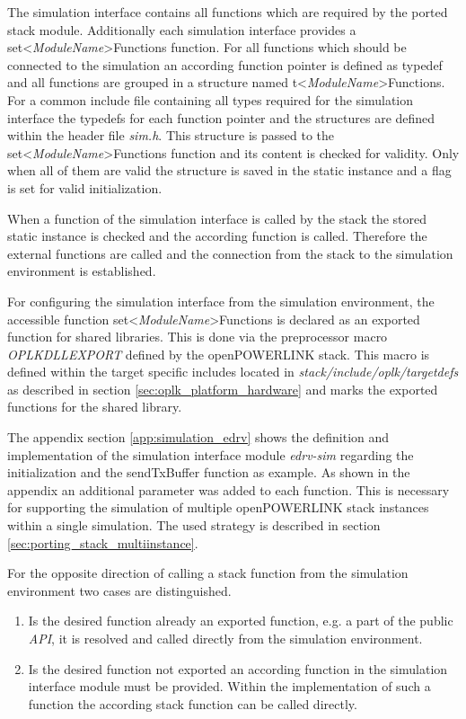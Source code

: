 \begin{sloppypar}
The simulation interface contains all functions which are required by the ported stack module.
Additionally each simulation interface provides a set<\emph{ModuleName}>Functions function.
For all functions which should be connected to the simulation an according function pointer is defined as typedef and all functions are grouped in a structure named t<\emph{ModuleName}>Functions.
For a common include file containing all types required for the simulation interface the typedefs for each function pointer and the structures are defined within the header file \emph{sim.h}.
This structure is passed to the set<\emph{ModuleName}>Functions function and its content is checked for validity.
Only when all of them are valid the structure is saved in the static instance and a flag is set for valid initialization.
\end{sloppypar}

When a function of the simulation interface is called by the stack the stored static instance is checked and the according function is called.
Therefore the external functions are called and the connection from the stack to the simulation environment is established.

For configuring the simulation interface from the simulation environment, the accessible function set<\emph{ModuleName}>Functions is declared as an exported function for shared libraries.
This is done via the preprocessor macro \emph{OPLKDLLEXPORT} defined by the openPOWERLINK stack.
This macro is defined within the target specific includes located in \emph{stack/include/oplk/targetdefs} as described in section \ref{sec:oplk_platform_hardware} and marks the exported functions for the shared library.

The appendix section \ref{app:simulation_edrv} shows the definition and implementation of the simulation interface module \emph{edrv-sim} regarding the initialization and the sendTxBuffer function as example.
As shown in the appendix an additional parameter was added to each function.
This is necessary for supporting the simulation of multiple openPOWERLINK stack instances within a single simulation.
The used strategy is described in section \ref{sec:porting_stack_multiinstance}.

For the opposite direction of calling a stack function from the simulation environment two cases are distinguished.

\begin{enumerate}
    \item Is the desired function already an exported function, e.g. a part of the public \emph{API}, it is resolved and called directly from the simulation environment.
    \item Is the desired function not exported an according function in the simulation interface module must be provided.
    Within the implementation of such a function the according stack function can be called directly.
\end{enumerate}

